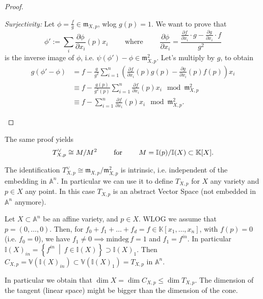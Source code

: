 \begin{proof}
\begin{description}
		\textit{Surjectivity:} Let $\phi = \frac{f}{g} \in \mathfrak{m}_{X,p}$, wlog $g(p) = 1$.
		We want to prove that
		\begin{equation}
			\phi' := \sum_{i}^{} \frac{\partial \phi}{\partial x_i} (p) x_i
			\qquad \text{ where } \qquad
			\frac{\partial \phi}{\partial x_i} =
			\frac{\frac{\partial f}{\partial x_i} \cdot g - \frac{\partial g}{\partial x_i} \cdot f }{g^2}
		\end{equation} 
		is the inverse image of $\phi$, i.e. $\psi(\phi') - \phi \in \mathfrak{m}^2_{X,p}$.
		Let's multiply by $g$, to obtain
		\begin{align}
			g \left( \phi' - \phi  \right) &=
			f - \frac{g}{g^2} \sum_{i = 1}^{n} \left( \frac{\partial f}{\partial x_i} (p) g(p) -
			\frac{\partial g}{\partial x_i} (p) f(p) \right)x_i\\
			&\equiv f - \frac{g(p)}{g^2(p)} \sum_{i=1}^{n} \frac{\partial f}{\partial x_i} (p) x_i
			\mod \mathfrak{m}^2_{X,p}\\
			&\equiv f - \sum_{i=1}^{n} \frac{\partial f}{\partial x_i} (p) x_i \mod \mathfrak{m}^2_{X,p}
		.\end{align} 
\end{description} 
\end{proof}

\begin{rem}[]
	The same proof yields
	\begin{equation}
	T_{X,p}^{\vee} \cong M/M^2 \qquad \text{ for } \qquad
	M = \mathbb{I}(p)/\mathbb{I}(X) \subset \mathbb{K}[X]
	.\end{equation} 
\end{rem}
\begin{rem}[]
	The identification $T_{X,p}^{\vee} \cong \mathfrak{m}_{X,p}/\mathfrak{m}^2_{X,p}$ is
	intrinsic, i.e. independent of the embedding in $\mathbb{A}^{n}$.
	In particular we can use it to define $T_{X,p}$ for $X$ any
	variety and $p \in X$ any point.
	In this case $T_{X,p}$ is an abstract Vector Space (not
	embedded in $\mathbb{A}^{n}$ anymore).
\end{rem}
 
\begin{rem}
	Let $X \subset \mathbb{A}^{n}$ be an affine variety, and $p \in X$.
	WLOG we assume that $p = \left( 0, \ldots, 0 \right)$.
	Then, for $f_0 + f_1 + \ldots + f_d = f \in \mathbb{K}\left[x_1, \ldots, x_n \right]$,
	with $f(p) = 0$ (i.e. $f_0 = 0$), we have
	$f_1 \neq 0 \implies \mathrm{mindeg}\, f = 1$ and $f_1 = f^{in}$.
	In particular $\mathbb{I}\left( X \right)_{in} = \left\{ f^{in} \ \middle|\ 
	f \in \mathbb{I}\left( X \right) \right\} \supset \mathbb{I}\left( X \right)_1$.
	Then $C_{X,p} = \mathbb{V}\left( \mathbb{I}\left( X \right)_{in} \right) \subset
	\mathbb{V}\left( \mathbb{I}\left( X \right)_1 \right) = T_{X,p}$ in $\mathbb{A}^{n}$.

	In particular we obtain that $\dim X = \dim C_{X,p} \leq \dim T_{X,p}$.
	The dimension of the tangent (linear space) might be bigger than the dimension of the cone.
\end{rem}

